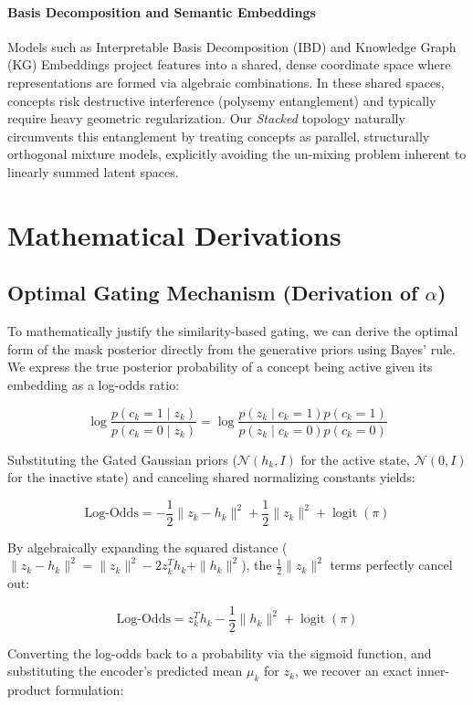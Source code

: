 \documentclass[11pt, a4paper]{article}
\begin{document}
\paragraph{Basis Decomposition and Semantic Embeddings}
Models such as Interpretable Basis Decomposition (IBD) and Knowledge Graph (KG) Embeddings project features into a shared, dense coordinate space where representations are formed via algebraic combinations. In these shared spaces, concepts risk destructive interference (polysemy entanglement) and typically require heavy geometric regularization. Our \textit{Stacked} topology naturally circumvents this entanglement by treating concepts as parallel, structurally orthogonal mixture models, explicitly avoiding the un-mixing problem inherent to linearly summed latent spaces.

\appendix
\section{Mathematical Derivations}

\subsection{Optimal Gating Mechanism (Derivation of $\alpha$)}
To mathematically justify the similarity-based gating, we can derive the optimal form of the mask posterior directly from the generative priors using Bayes' rule. We express the true posterior probability of a concept being active given its embedding as a log-odds ratio:

\[
\log \frac{p(c_k = 1 \mid z_k)}{p(c_k = 0 \mid z_k)} = \log \frac{p(z_k \mid c_k = 1) p(c_k = 1)}{p(z_k \mid c_k = 0) p(c_k = 0)}
\]

Substituting the Gated Gaussian priors ($\mathcal{N}(h_k, I)$ for the active state, $\mathcal{N}(0, I)$ for the inactive state) and canceling shared normalizing constants yields:

\[
\text{Log-Odds} = -\frac{1}{2}\|z_k - h_k\|^2 + \frac{1}{2}\|z_k\|^2 + \operatorname{logit}(\pi)
\]

By algebraically expanding the squared distance ($\|z_k - h_k\|^2 = \|z_k\|^2 - 2 z_k^T h_k + \|h_k\|^2$), the $\frac{1}{2}\|z_k\|^2$ terms perfectly cancel out:

\[
\text{Log-Odds} = z_k^T h_k - \frac{1}{2}\|h_k\|^2 + \operatorname{logit}(\pi)
\]

Converting the log-odds back to a probability via the sigmoid function, and substituting the encoder's predicted mean $\mu_k$ for $z_k$, we recover an exact inner-product formulation:
\end{document}
